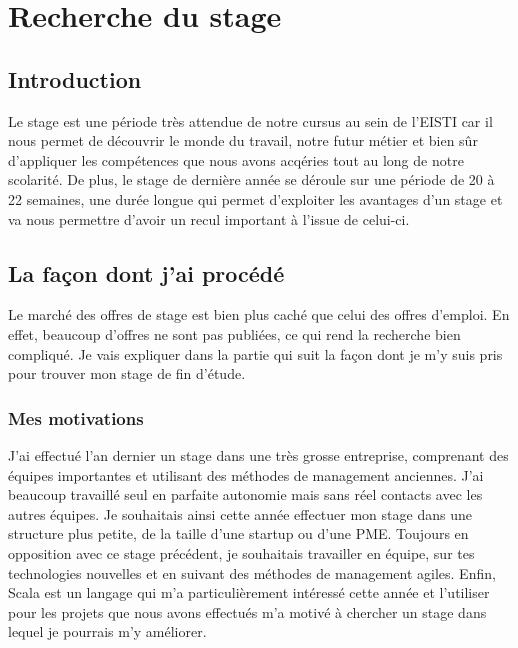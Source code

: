 
\chapter{Recherche du stage} %

\label{presentation} %



\section{Introduction}

Le stage est une période très attendue de notre cursus au sein de l’EISTI car il nous permet de découvrir le monde du travail, notre futur métier et bien sûr d’appliquer les compétences que nous avons acqéries tout au long de notre scolarité.
De plus, le stage de dernière année se déroule sur une période de 20 à 22 semaines, une durée longue qui permet d'exploiter les avantages d’un stage et va nous permettre d’avoir un recul important à l’issue de celui-ci.


\section{La façon dont j'ai procédé}
Le marché des offres de stage est bien plus caché que celui des offres d'emploi.
En effet, beaucoup d'offres ne sont pas publiées, ce qui rend la recherche bien compliqué.
Je vais expliquer dans la partie qui suit la façon dont je m'y suis pris pour trouver mon stage de fin d'étude.

\subsection{Mes motivations}
J'ai effectué l'an dernier un stage dans une très grosse entreprise, comprenant des équipes importantes et utilisant des méthodes de management anciennes.
J'ai beaucoup travaillé seul en parfaite autonomie mais sans réel contacts avec les autres équipes.
Je souhaitais ainsi cette année effectuer mon stage dans une structure plus petite, de la taille d'une startup ou d'une PME.
Toujours en opposition avec ce stage précédent, je souhaitais travailler en équipe, sur tes technologies nouvelles et en suivant des méthodes de management agiles.
Enfin, Scala est un langage qui m'a particulièrement intéressé cette année et l'utiliser pour les projets que nous avons effectués m'a motivé à chercher un stage dans lequel je pourrais m'y améliorer.

